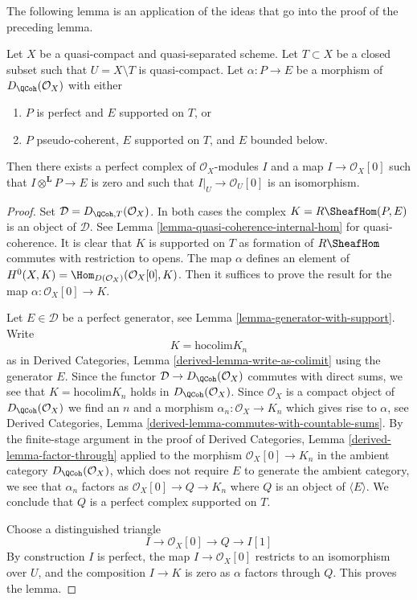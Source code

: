 \noindent
The following lemma is an application of the ideas that go into
the proof of the preceding lemma.

\begin{lemma}
\label{lemma-map-from-pseudo-coherent-to-complex-with-support}
Let $X$ be a quasi-compact and quasi-separated scheme. Let $T \subset X$
be a closed subset such that $U = X \setminus T$ is quasi-compact.
Let $\alpha : P \to E$ be a morphism of $D_\QCoh(\mathcal{O}_X)$ with
either
\begin{enumerate}
\item $P$ is perfect and $E$ supported on $T$, or
\item $P$ pseudo-coherent, $E$ supported on $T$, and $E$ bounded below.
\end{enumerate}
Then there exists a perfect complex of $\mathcal{O}_X$-modules $I$
and a map $I \to \mathcal{O}_X[0]$ such that
$I \otimes^\mathbf{L} P \to E$ is zero and such that
$I|_U \to \mathcal{O}_U[0]$ is an
isomorphism.
\end{lemma}

\begin{proof}
Set $\mathcal{D} = D_{\QCoh, T}(\mathcal{O}_X)$. In both cases the complex
$K = R\SheafHom(P, E)$ is an object of $\mathcal{D}$. See
Lemma \ref{lemma-quasi-coherence-internal-hom} for quasi-coherence.
It is clear that $K$ is supported on $T$ as formation of $R\SheafHom$
commutes with restriction to opens.
The map $\alpha$ defines an element of
$H^0(X, K) = \Hom_{D(\mathcal{O}_X)}(\mathcal{O}_X[0], K)$.
Then it suffices to prove the result for the map
$\alpha : \mathcal{O}_X[0] \to K$.

\medskip\noindent
Let $E \in \mathcal{D}$ be a perfect generator, see
Lemma \ref{lemma-generator-with-support}. Write
$$
K = \text{hocolim} K_n
$$
as in Derived Categories, Lemma \ref{derived-lemma-write-as-colimit}
using the generator $E$. Since the functor $\mathcal{D} \to D_\QCoh(\mathcal{O}_X)$
commutes with direct sums, we see that $K = \text{hocolim} K_n$
holds in $D_\QCoh(\mathcal{O}_X)$. Since $\mathcal{O}_X$ is a compact
object of $D_\QCoh(\mathcal{O}_X)$ we find an $n$ and a morphism
$\alpha_n : \mathcal{O}_X \to K_n$ which gives rise to $\alpha$, see
Derived Categories, Lemma \ref{derived-lemma-commutes-with-countable-sums}.
By the finite-stage argument in the proof of Derived Categories, Lemma \ref{derived-lemma-factor-through}
applied to the morphism $\mathcal{O}_X[0] \to K_n$ in the ambient
category $D_\QCoh(\mathcal{O}_X)$, which does not require $E$ to generate
the ambient category, we see that $\alpha_n$ factors as
$\mathcal{O}_X[0] \to Q \to K_n$ where $Q$ is an object
of $\langle E \rangle$. We conclude that $Q$ is a perfect complex
supported on $T$.

\medskip\noindent
Choose a distinguished triangle
$$
I \to \mathcal{O}_X[0] \to Q \to I[1]
$$
By construction $I$ is perfect, the map $I \to \mathcal{O}_X[0]$
restricts to an isomorphism over $U$, and the composition
$I \to K$ is zero as $\alpha$ factors through $Q$.
This proves the lemma.
\end{proof}







